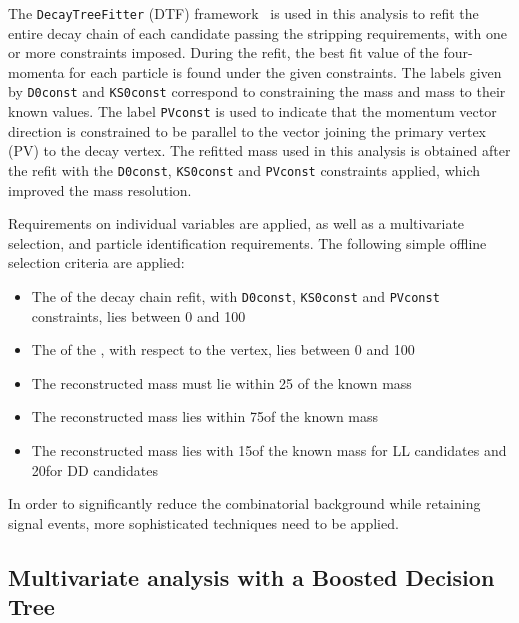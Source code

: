 The {\tt DecayTreeFitter} (DTF) framework~\cite{Hulsbergen:2005pu} is used in this analysis to refit the entire decay chain of each \B candidate passing the stripping requirements, with one or more constraints imposed. During the refit, the best fit value of the four-momenta for each particle is found under the given constraints. The labels given by {\tt D0const} and {\tt KS0const} correspond to constraining the \D mass and \KS mass to their known values. The label {\tt PVconst} is used to indicate that the \B momentum vector direction is constrained to be parallel to the vector joining the primary vertex (PV) to the \B decay vertex. The refitted \B mass used in this analysis is obtained after the refit with the {\tt D0const}, {\tt KS0const} and {\tt PVconst} constraints applied, which improved the \B mass resolution.

Requirements on individual variables are applied, as well as a multivariate selection, and particle identification requirements. The following simple offline selection criteria are applied:

\begin{itemize}
\item The \chisq of the decay chain refit, with {\tt D0const}, {\tt KS0const} and {\tt PVconst} constraints, lies between 0 and 100
\item The \chisqip of the \B, with respect to the \B vertex, lies between 0 and 100
\item The reconstructed \Dz mass must lie within 25 \mev of the known \Dz mass
\item The reconstructed \Kstarpm mass lies within 75\mev of the known \Kstar mass
\item The reconstructed \KS mass lies with 15\mev of the known \KS mass for LL candidates and 20\mev for DD candidates
\end{itemize}

In order to significantly reduce the combinatorial background while retaining signal events, more sophisticated techniques need to be applied.

\subsection{Multivariate analysis with a Boosted Decision Tree}
\label{sec:selection:bdt}

